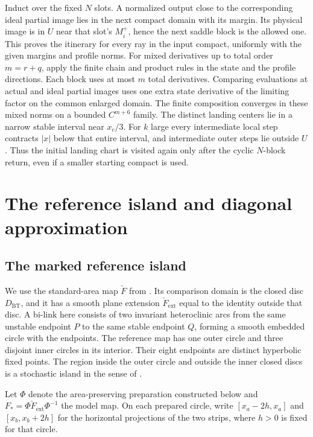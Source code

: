 \documentclass[11pt]{article}
\begin{document}
Induct over the fixed \(N\) slots. A normalized output close to the
corresponding ideal partial image lies in the next compact domain with its
margin. Its physical image is in \(U\) near that slot's \(M_i^+\), hence the
next saddle block is the allowed one. This proves the itinerary for every ray in
the input compact, uniformly with the given margins and profile norms. For mixed
derivatives up to total order \(m=r+q\), apply the finite chain and product
rules in the state and the profile directions. Each block uses at most \(m\)
total derivatives. Comparing evaluations at actual and ideal partial images uses
one extra state derivative of the limiting factor on the common enlarged domain.
The finite composition converges in these mixed norms on a bounded \(C^{m+6}\)
family. The distinct landing centers lie in a narrow stable interval near
\(x_c/3\). For \(k\) large every intermediate local step contracts \(|x|\) below
that entire interval, and intermediate outer steps lie outside \(U\). Thus the
initial landing chart is visited again only after the cyclic \(N\)-block return,
even if a smaller starting compact is used.

\section{The reference island and diagonal approximation}\label{sec:model}

\subsection{The marked reference island}\label{the-marked-reference-island}

We use the standard-area map \(\check F\) from
\cite[Proposition 2.1 and \S3.4]{BT}. Its comparison domain is the closed disc
\(D_{\mathrm{BT}}\), and it has a smooth plane extension
\(\check F_{\mathrm{ext}}\) equal to the identity outside that disc. A bi-link
here consists of two invariant heteroclinic arcs from the same unstable endpoint
\(P\) to the same stable endpoint \(Q\), forming a smooth embedded circle with
the endpoints. The reference map has one outer circle and three disjoint inner
circles in its interior. Their eight endpoints are distinct hyperbolic fixed
points. The region inside the outer circle and outside the inner closed discs is
a stochastic island in the sense of \cite{BT}.

Let \(\Phi\) denote the area-preserving preparation constructed below
and \(F_*=\Phi\check F_{\mathrm{ext}}\Phi^{-1}\) the model map.
On each prepared circle, write \([x_a-2h,x_a]\) and
\([x_b,x_b+2h]\) for the horizontal projections of the two strips,
where \(h>0\) is fixed for that circle.
\end{document}
